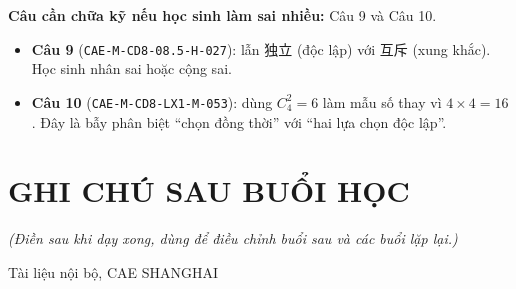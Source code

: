 \documentclass[11pt, a4paper]{article}
\begin{document}
\textbf{Câu cần chữa kỹ nếu học sinh làm sai nhiều:} Câu 9 và Câu 10.

\begin{itemize}[leftmargin=1.4em, itemsep=2pt]
\item \textbf{Câu 9} (\texttt{CAE-M-CD8-08.5-H-027}): lẫn 独立 (độc lập) với 互斥 (xung khắc). Học sinh nhân sai hoặc cộng sai.
\item \textbf{Câu 10} (\texttt{CAE-M-CD8-LX1-M-053}): dùng $C_4^2 = 6$ làm mẫu số thay vì $4 \times 4 = 16$. Đây là bẫy phân biệt “chọn đồng thời” với “hai lựa chọn độc lập”.
\end{itemize}

\section{GHI CHÚ SAU BUỔI HỌC}

\emph{(Điền sau khi dạy xong, dùng để điều chỉnh buổi sau và các buổi lặp lại.)}

\vspace{0.8cm}
\begin{center}
{\footnotesize\color{cae_blue} Tài liệu nội bộ, CAE SHANGHAI}
\end{center}
\end{document}
